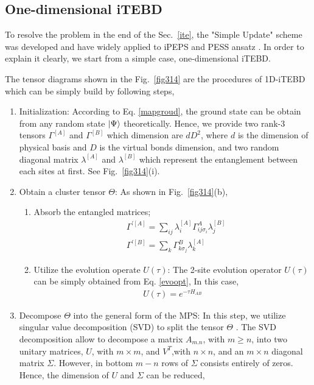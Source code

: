 \subsection{One-dimensional iTEBD}
To resolve the problem in the end of the Sec.~\ref{ite}, the "Simple Update" scheme was developed and have widely applied to iPEPS and PESS ansatz \cite{PhysRevX.4.011025}. In order to explain it clearly, we start from a simple case, one-dimensional iTEBD. 

The tensor diagrams shown in the Fig.~\ref{fig314} are the procedures of 1D-iTEBD which can be simply build by following steps,
\begin{enumerate}
	\item Initialization: According to Eq. \ref{mapgroud}, the ground state can be obtain from any random state $\Ket{\Psi}$ theoretically. Hence, we provide two rank-3 tensors $\Gamma^{[A]}$ and $\Gamma^{[B]}$ which dimension are $dD^2$, where $d$ is the dimension of physical basis and $D$ is the virtual bonds dimension, and two random diagonal matrix $\lambda^{[A]}$ and $\lambda^{[B]}$ which represent the entanglement between each sites at first. See Fig.~\ref{fig314}(i).
	\item Obtain a cluster tensor $\Theta$: As shown in Fig.~\ref{fig314}(b),
		\begin{enumerate}
			\item Absorb the entangled matrices; 
				\begin{align}
					&\Gamma^{\prime [A]} = \sum_{ij}{\lambda^{[A]}_{i} \Gamma^{A}_{ij \sigma_i} \lambda^{[B]}_{j}} \\
					&\Gamma^{\prime [B]} = \sum_{k}{\Gamma^{B}_{k \sigma_j} \lambda^{[A]}_{k}}
				\end{align}
			\item Utilize the evolution operate $U(\tau)$: The 2-site evolution operator $U(\tau)$ can be simply obtained from Eq. \ref{evoopt}, In this case, 
				\begin{align}
					U(\tau) = e^{-\tau H_{AB}}
				\end{align}
		\end{enumerate}
	\item Decompose $\Theta$ into the general form of the MPS: In this step, we utilize singular value decomposition (SVD) to split the tensor $\Theta$ . The SVD decomposition allow to decompose a matrix $A_{m.n}$, with $m \geq n$, into two unitary matrices, $U$, with $m \times m$, and $V^{T}$,with $n \times n$, and an $m \times n$ diagonal matrix $\Sigma$. However, in bottom $m - n$ rows of $\Sigma$ consists entirely of zeros. Hence, the dimension of $U$ and $\Sigma$ can be reduced,

\end{enumerate}
